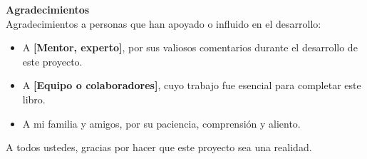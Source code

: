
\thispagestyle{empty} %


\vspace*{2cm}

{\Huge \textbf{Agradecimientos}} \\[1.0cm]
 
Agradecimientos a personas que han apoyado o influido en el desarrollo:

\begin{center}
\begin{itemize}
    \item A \textbf{[Mentor, experto]}, por sus valiosos comentarios durante el desarrollo de este proyecto.
    \item A \textbf{[Equipo o colaboradores]}, cuyo trabajo fue esencial para completar este libro.
    \item A mi familia y amigos, por su paciencia, comprensión y aliento.
\end{itemize}
\end{center}
A todos ustedes, gracias por hacer que este proyecto sea una realidad.
\clearpage